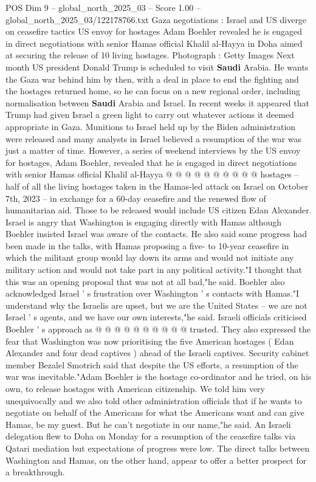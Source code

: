 \begin{textsample}{POS Dim 9 – global\_north\_2025\_03 – Score 1.00 – global\_north\_2025\_03/122178766.txt}  \label{ex:f9_pos_299}
Gaza negotiations : Israel and US diverge on ceasefire tactics US envoy for hostages Adam Boehler revealed he is engaged in direct negotiations with senior Hamas official Khalil al-Hayya in Doha aimed at securing the release of 10 living hostages.
Photograph : Getty Images Next month US president Donald Trump is scheduled to visit \textbf{Saudi} Arabia.
He wants the Gaza war behind him by then, with a deal in place to end the fighting and the hostages returned home, so he can focus on a new regional order, including normalisation between \textbf{Saudi} Arabia and Israel.
In recent weeks it appeared that Trump had given Israel a green light to carry out whatever actions it deemed appropriate in Gaza.
Munitions to Israel held up by the Biden administration were released and many analysts in Israel believed a resumption of the war was just a matter of time.
However, a series of weekend interviews by the US envoy for hostages, Adam Boehler, revealed that he is engaged in direct negotiations with senior Hamas official Khalil al-Hayya @ @ @ @ @ @ @ @ @ @ hostages -- half of all the living hostages taken in the Hamas-led attack on Israel on October 7th, 2023 -- in exchange for a 60-day ceasefire and the renewed flow of humanitarian aid.
Those to be released would include US citizen Edan Alexander.
Israel is angry that Washington is engaging directly with Hamas although Boehler insisted Israel was aware of the contacts.
He also said some progress had been made in the talks, with Hamas proposing a five- to 10-year ceasefire in which the militant group would lay down its arms and would not initiate any military action and would not take part in any political activity."I thought that this was an opening proposal that was not at all bad,"he said.
Boehler also acknowledged Israel ' s frustration over Washington ' s contacts with Hamas."I understand why the Israelis are upset, but we are the United States -- we are not Israel ' s agents, and we have our own interests,"he said.
Israeli officials criticised Boehler ' s approach as @ @ @ @ @ @ @ @ @ @ trusted.
They also expressed the fear that Washington was now prioritising the five American hostages ( Edan Alexander and four dead captives ) ahead of the Israeli captives.
Security cabinet member Bezalel Smotrich said that despite the US efforts, a resumption of the war was inevitable."Adam Boehler is the hostage co-ordinator and he tried, on his own, to release hostages with American citizenship.
We told him very unequivocally and we also told other administration officials that if he wants to negotiate on behalf of the Americans for what the Americans want and can give Hamas, be my guest.
But he can't negotiate in our name,"he said.
An Israeli delegation flew to Doha on Monday for a resumption of the ceasefire talks via Qatari mediation but expectations of progress were low.
The direct talks between Washington and Hamas, on the other hand, appear to offer a better prospect for a breakthrough.

\end{textsample}
